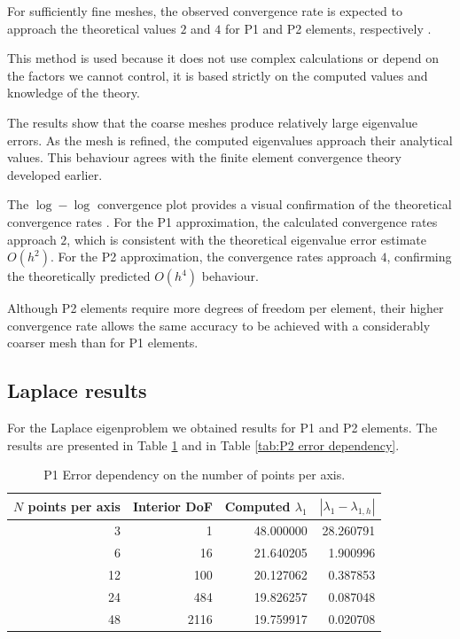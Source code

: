 \documentclass[conference]{IEEEtran}
\begin{document}
For sufficiently fine meshes, the observed convergence rate is expected to approach the theoretical values $2$ and $4$ for P1 and P2 elements, respectively \cite{b12.4}.

This method is used because it does not use complex calculations or depend on the factors we cannot control, it is based strictly on the computed values and knowledge of the theory.

The results show that the coarse meshes produce relatively large eigenvalue errors. As the mesh is refined, the computed eigenvalues approach their analytical values. This behaviour agrees with the finite element convergence theory developed earlier.

The $\log-\log$ convergence plot provides a visual confirmation of the theoretical convergence rates \cite{b26}. For the P1 approximation, the calculated convergence rates approach $2$, which is consistent with the theoretical eigenvalue error estimate $O(h^2)$. For the P2 approximation, the convergence rates approach $4$, confirming the theoretically predicted $O(h^4)$ behaviour.

Although P2 elements require more degrees of freedom per element, their higher convergence rate allows the same accuracy to be achieved with a considerably coarser mesh than for P1 elements.


\subsection{Laplace results} \label{sec: P1 vs P2}
For the Laplace eigenproblem we obtained results for P1 and P2 elements. The results are presented in Table \ref{tab:P1 error dependency} and in Table \ref{tab:P2 error dependency}.
\begin{table}[H]
    \centering
    \caption{P1 Error dependency on the number of points per axis.}
    \label{tab:P1 error dependency}
    \begin{tabular}{rrrr}
        \toprule
        $N$ points per axis & Interior DoF & Computed $\lambda_1$ & $|\lambda_1 - \lambda_{1,h}|$ \\
        \midrule
        3 & 1 & 48.000000 & 28.260791 \\
        6 & 16 & 21.640205 & 1.900996 \\
        12 & 100 & 20.127062 & 0.387853 \\
        24 & 484 & 19.826257 & 0.087048 \\
        48 & 2116 & 19.759917 & 0.020708 \\
        \bottomrule
    \end{tabular}
\end{table}
\end{document}
